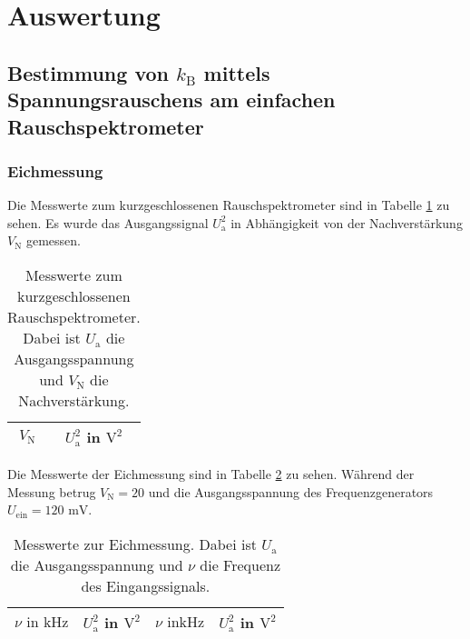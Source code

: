 

\section{Auswertung}

\subsection{Bestimmung von $k_\text{B}$ mittels Spannungsrauschens am
			einfachen Rauschspektrometer}


	\subsubsection{Eichmessung}

		Die Messwerte zum kurzgeschlossenen Rauschspektrometer sind
		in Tabelle \ref{tab:eichung_eigenrauschen_einfach} zu sehen.
		Es wurde das Ausgangssignal $U^2_\text{a}$ in Abhängigkeit von
		der Nachverstärkung $V_\text{N}$ gemessen.

		\begin{table}[h]
		\centering
			\begin{tabular}{cc}
				\toprule \midrule
				$V_\text{N}$ & $U^2_\text{a}$ in $\text{V}^2$
				\\
				\midrule
				
				\midrule \bottomrule
			\end{tabular}
			\caption{Messwerte zum kurzgeschlossenen
			Rauschspektrometer. Dabei ist $U_\text{a}$ die
			Ausgangsspannung und $V_\text{N}$ die Nachverstärkung.}
			\label{tab:eichung_eigenrauschen_einfach}
		\end{table}

		Die Messwerte der Eichmessung sind in Tabelle
		\ref{tab:eichung_einfach} zu sehen. Während der Messung
		betrug $V_\text{N}=20$ und die Ausgangsspannung des
		Frequenzgenerators $U_\text{ein} = 120 \text{ mV}$.

		\begin{table}[h]
		\centering
			\begin{tabular}{cccc}
				\toprule \midrule
				$\nu \text{ in} \text{ kHz}$ & $U^2_\text{a}$ in $\text{V}^2$ &$\nu \text{ in} \text{
				kHz}$ & $U^2_\text{a}$ in $\text{V}^2$
				\\
				\midrule
				
				\midrule \bottomrule
			\end{tabular}
			\caption{Messwerte zur Eichmessung. Dabei ist $U_\text{a}$
			die
			Ausgangsspannung und $\nu$ die Frequenz des
			Eingangssignals. }
			\label{tab:eichung_einfach}
		\end{table}

